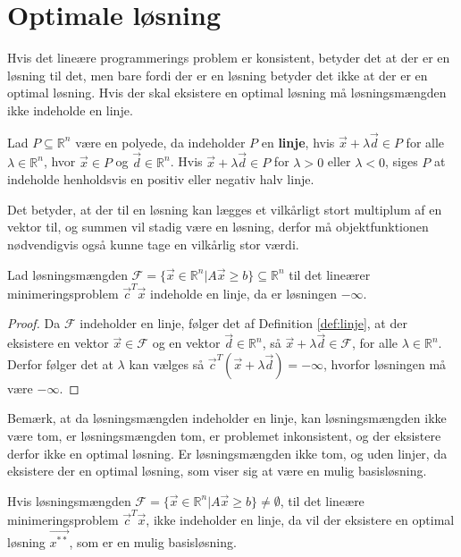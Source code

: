 \section{Optimale løsning}
\label{sec:eksistens}
Hvis det lineære programmerings problem er konsistent, betyder det at der er en løsning til det, men bare fordi der er en løsning betyder det ikke at der er en optimal løsning.
Hvis der skal eksistere en optimal løsning må løsningsmængden ikke indeholde en linje.
\begin{defn}[Linje]
Lad $P\subseteq \mathds{R}^n $ være en polyede, da indeholder $P$ en \textbf{linje}, hvis $\vec{x}+\lambda\vec{d} \in P$ for alle $\lambda \in \mathds{R}^n$, hvor $\vec{x}\in P$ og $\vec{d} \in \mathds{R}^n$. Hvis $\vec{x}+\lambda\vec{d} \in P$ for $\lambda > 0$ eller $\lambda < 0$, siges $P$ at indeholde henholdsvis en positiv eller negativ halv linje.
\label{def:linje}
\end{defn}
Det betyder, at der til en løsning kan lægges et vilkårligt stort multiplum af en vektor til, og summen vil stadig være en løsning, derfor må objektfunktionen nødvendigvis også kunne tage en vilkårlig stor værdi.
\begin{prop}
Lad løsningsmængden $\mathcal{F} = \{ \vec{x} \in \mathds{R}^n| A \vec{x} \geq b \} \subseteq \mathds{R}^n $  til det lineærer minimeringsproblem $\vec{c}^T\vec{x}$ indeholde en linje, da er løsningen $-\infty$.
\end{prop}
\begin{proof}
Da $\mathcal{F}$ indeholder en linje, følger det af Definition \ref{def:linje}, at der eksistere en vektor $\vec{x} \in \mathcal{F}$ og en vektor $\vec{d} \in \mathds{R}^n$, så $\vec{x}+\lambda \vec{d} \in \mathcal{F}$, for alle $\lambda \in \mathds{R}^n$. 
Derfor følger det at $\lambda$ kan vælges så $\vec{c}^T(\vec{x}+\lambda\vec{d}) = - \infty$, hvorfor løsningen må være $-\infty$.
\end{proof}
Bemærk, at da løsningsmængden indeholder en linje, kan løsningsmængden ikke være tom, er løsningsmængden tom, er problemet inkonsistent, og der eksistere derfor ikke en optimal løsning. 
Er løsningsmængden ikke tom, og uden linjer, da eksistere der en optimal løsning, som viser sig at være en mulig basisløsning.
\begin{stn}
Hvis løsningsmængden $\mathcal{F} =\{\vec{x} \in \mathds{R}^n| A \vec{x} \geq b \} \neq \emptyset$, til det lineære minimeringsproblem $\vec{c}^T\vec{x}$, ikke indeholder en linje, da vil der eksistere en optimal løsning $\vec{x^{**}}$, som er en mulig basisløsning.
\label{stn:eksistens}
\end{stn}
